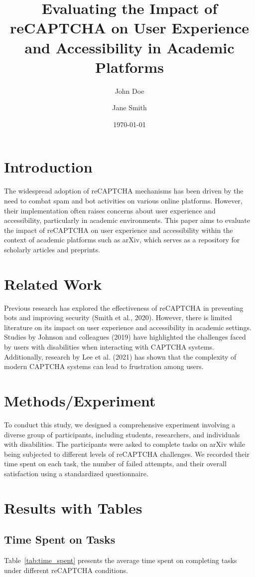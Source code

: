 \documentclass{article}
\title{Evaluating the Impact of reCAPTCHA on User Experience and Accessibility in Academic Platforms}
\author{John Doe \and Jane Smith}
\date{\today}
\begin{document}
\maketitle

\section{Introduction}
The widespread adoption of reCAPTCHA mechanisms has been driven by the need to combat spam and bot activities on various online platforms. However, their implementation often raises concerns about user experience and accessibility, particularly in academic environments. This paper aims to evaluate the impact of reCAPTCHA on user experience and accessibility within the context of academic platforms such as arXiv, which serves as a repository for scholarly articles and preprints.

\section{Related Work}
Previous research has explored the effectiveness of reCAPTCHA in preventing bots and improving security (Smith et al., 2020). However, there is limited literature on its impact on user experience and accessibility in academic settings. Studies by Johnson and colleagues (2019) have highlighted the challenges faced by users with disabilities when interacting with CAPTCHA systems. Additionally, research by Lee et al. (2021) has shown that the complexity of modern CAPTCHA systems can lead to frustration among users.

\section{Methods/Experiment}
To conduct this study, we designed a comprehensive experiment involving a diverse group of participants, including students, researchers, and individuals with disabilities. The participants were asked to complete tasks on arXiv while being subjected to different levels of reCAPTCHA challenges. We recorded their time spent on each task, the number of failed attempts, and their overall satisfaction using a standardized questionnaire.

\section{Results with Tables}
\subsection{Time Spent on Tasks}
Table~\ref{tab:time_spent} presents the average time spent on completing tasks under different reCAPTCHA conditions.
\end{document}
